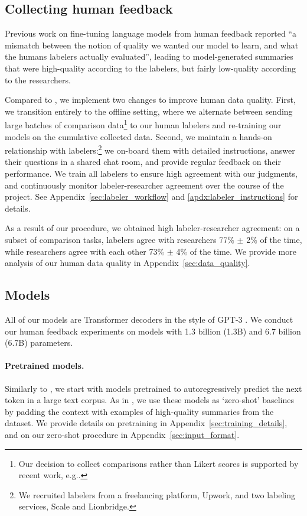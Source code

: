 \subsection{Collecting human feedback}
\label{sec:collectingfeedback}

Previous work on fine-tuning language models from human feedback \cite{ziegler2019fine} reported ``a mismatch between the notion of quality we wanted our model to learn, and what the humans labelers actually evaluated”, leading to model-generated summaries that were high-quality according to the labelers, but fairly low-quality according to the researchers. 

Compared to \cite{ziegler2019fine}, we implement two changes to improve human data quality. First, we transition entirely to the offline setting, where we alternate between sending large batches of comparison data\footnote{Our decision to collect comparisons rather than Likert scores is supported by recent work, e.g.\@ \cite{li2019acute}.} to our human labelers and re-training our models on the cumulative collected data. Second, we maintain a hands-on relationship with labelers:\footnote{We recruited labelers from a freelancing platform, Upwork, and two labeling services, Scale and Lionbridge.} we on-board them with detailed instructions, answer their questions in a shared chat room, and provide regular feedback on their performance. We train all labelers to ensure high agreement with our judgments, and continuously monitor labeler-researcher agreement over the course of the project. See Appendix~\ref{sec:labeler_workflow} and \ref{apdx:labeler_instructions} for details.

As a result of our procedure, we obtained high labeler-researcher agreement: on a subset of comparison tasks, labelers agree with researchers 77\% $\pm$ 2\% of the time, while researchers agree with each other 73\% $\pm$ 4\% of the time. We provide more analysis of our human data quality in Appendix~\ref{sec:data_quality}. 

\subsection{Models}
\label{sec:models}
All of our models are Transformer decoders \cite{vaswani2017attention} in the style of GPT-3 \cite{radford2018improving,brown2020language}. We conduct our human feedback experiments on models with 1.3 billion (1.3B) and 6.7 billion (6.7B) parameters. 

\paragraph{Pretrained models.} Similarly to \cite{dai2015semi,radford2018improving}, we start with models pretrained to autoregressively predict the next token in a large text corpus.   As in \cite{radford2019language,brown2020language}, we use these models as ‘zero-shot’ baselines by padding the context with examples of high-quality summaries from the dataset. We provide details on pretraining in Appendix~\ref{sec:training_details}, and on our zero-shot procedure in Appendix~\ref{sec:input_format}.

